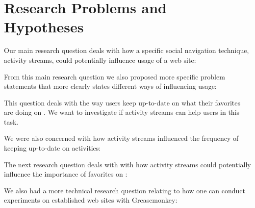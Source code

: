 \section{Research Problems and Hypotheses}

Our main research question deals with how a specific social navigation
technique, activity streams, could potentially influence usage of a web site:

\begin{quote}
\end{quote}

From this main research question we also proposed more specific problem
statements that more clearly states different ways of influencing usage:

\begin{quote}
\end{quote}

This question deals with the way users keep up-to-date on what their favorites
are doing on \urort{}. We want to investigate if activity streams can help
users in this task.

We were also concerned with how activity streams influenced the
frequency of keeping up-to-date on activities:

\begin{quote}
\end{quote}

The next research question deals with with how activity streams could
potentially influence the importance of favorites on \urort{}:

\begin{quote}
\end{quote}

We also had a more technical research question relating to how one can
conduct experiments on established web sites with Greasemonkey:

\begin{quote}
\end{quote}

